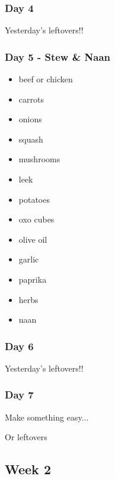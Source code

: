 \documentclass[11pt, a4paper]{article}
\begin{document}
\subsubsection{Day 4}
\vspace{1pc}
Yesterday's leftovers!!
\vspace{2pc}

\subsubsection{Day 5 - Stew \& Naan}
\vspace{1pc}
\begin{itemize}
\item beef or chicken
\item carrots
\item onions
\item squash
\item mushrooms
\item leek
\item potatoes
\item oxo cubes
\item olive oil
\item garlic
\item paprika
\item herbs
\item naan
\end{itemize}

\subsubsection{Day 6}
\vspace{1pc}
Yesterday's leftovers!!
\vspace{2pc}

\subsubsection{Day 7}
\vspace{1pc}
\noindent Make something easy...
\par
Or leftovers


\vspace{0.917 pc} %

\pagebreak
\subsection{Week 2}
\end{document}

